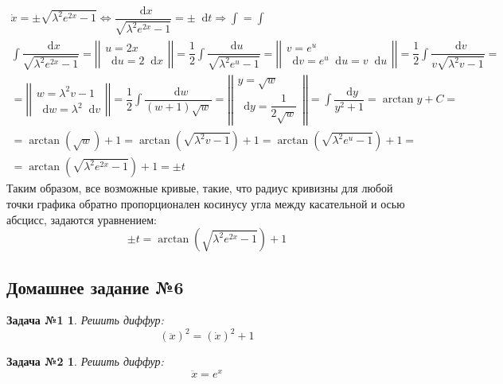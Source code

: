\documentclass[a4paper,12pt]{article}
\newtheorem*{task1}{Задача №1}
\newtheorem*{task2}{Задача №2}
\renewcommand*\d{\mathop{}\!\mathrm{d}}
\newcommand{\dx}{\dot{x}}
\newcommand{\ddx}{\ddot{x}}
\newcommand{\bto}{\Longrightarrow}
\newcommand{\ds}{\displaystyle}
\begin{document}
\begin{gather*}
	\dx = \pm\sqrt{\lambda^2e^{2x} - 1} \iff \dfrac{\d x}{\sqrt{\lambda^2e^{2x} - 1}} = \pm\d t \bto \ds\int = \ds\int \\
	\ds\int \dfrac{\d x}{\sqrt{\lambda^2e^{2x} - 1}} = \left|\left|\begin{gathered}
		u = 2x\\
		\d u = 2\d x
	\end{gathered}\right|\right| = \dfrac{1}{2}\ds\int \dfrac{\d u}{\sqrt{\lambda^2e^{u} - 1}}  = \left|\left|\begin{gathered}
	v = e^u\\
	\d v = e^u\d u = v\d u
	\end{gathered}\right|\right| = \dfrac{1}{2}\ds\int \dfrac{\d v}{v\sqrt{\lambda^2v - 1}} = \\
	= \left|\left|\begin{gathered}
	w = \lambda^2v - 1\\
	\d w = \lambda^2\d v
	\end{gathered}\right|\right| = \dfrac{1}{2}\ds\int \dfrac{\d w}{(w + 1)\sqrt{w}} = \left|\left|\begin{gathered}
	y = \sqrt{w}\\
	\d y = \dfrac{1}{2\sqrt{w}}
	\end{gathered}\right|\right| = \ds\int \dfrac{\d y}{y^2 + 1} = \arctan y + C = \\
	= \arctan(\sqrt{w}) + 1 = \arctan(\sqrt{\lambda^2v - 1}) + 1 = \arctan(\sqrt{\lambda^2e^u - 1}) + 1 = \\ =
	\arctan(\sqrt{\lambda^2e^{2x} - 1}) + 1 = \pm t
\end{gather*}
Таким образом, все возможные кривые, такие, что радиус кривизны для любой точки графика обратно пропорционален косинусу угла между касательной и осью абсцисс, задаются уравнением:
\[\pm t = \arctan(\sqrt{\lambda^2e^{2x} - 1}) + 1 \]


\subsection{Домашнее задание №6}

\begin{task1}
	Решить диффур:
	\[(\ddx)^2 = (\dx)^2 + 1\]
\end{task1}
%

\begin{task2}
	Решить диффур:
	\[\ddx = e^x\]
\end{task2}
%
\end{document}
